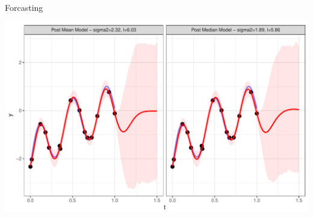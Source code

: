 \documentclass[11pt,ignorenonframetext,]{beamer}
\begin{document}
\begin{frame}{Forcasting}

\includegraphics{Lec12_files/figure-beamer/unnamed-chunk-21-1.pdf}

\end{frame}
\end{document}
